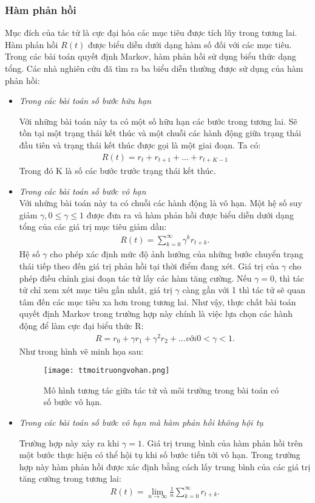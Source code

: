 \subsubsection{Hàm phản hồi}
Mục đích của tác tử là cực đại hóa các mục tiêu được tích lũy trong tương lai. Hàm phản hồi $R(t)$ được biểu diễn dưới dạng hàm số đối với các mục tiêu. Trong các bài toán quyết định Markov, hàm phản hồi sử dụng biểu thức dạng tổng. Các nhà nghiên cứu đã tìm ra ba biểu diễn thường được sử dụng của hàm phản hồi:
\begin{itemize}
\item \textit{Trong các bài toán số bước hữu hạn}

Với những bài toán này ta có một số hữu hạn các bước trong tương lai. Sẽ tồn tại một trạng thái kết thúc và một chuỗi các hành động giữa trạng thái đầu tiên và trạng thái kết thúc được gọi là một giai đoạn.
Ta có:
\begin{align*}
R(t)=r_{t}+r_{t+1}+...+r_{t+K-1}
\end{align*}
	Trong đó K là số các bước trước trạng thái kết thúc.
\item \textit{Trong các bài toán số bước vô hạn}\\
	Với những bài toán này ta có chuỗi các hành động là vô hạn. Một hệ số suy giảm $\gamma,0\leq \gamma \leq 1$ được đưa ra và hàm phản hồi được biểu diễn dưới dạng tổng của các giá trị mục tiêu giảm dần:
\begin{align*}
R(t)= \sum_{k=0}^{\infty} \gamma ^{k} r_{t+k}.
\end{align*}
Hệ số $\gamma$ cho phép xác định mức độ ảnh hưởng của những bước chuyển trạng thái tiếp theo đến giá trị phản hồi tại thời điểm đang xét. Giá trị của $\gamma$ cho phép điều chỉnh giai đoạn tác tử lấy các hàm tăng cường. Nếu $\gamma =0$, thì tác tử chỉ xem xét mục tiêu gần nhất, giá trị $\gamma$ càng gần với 1 thì tác tử sẽ quan tâm đến các mục tiêu xa hơn trong tương lai.
Như vậy, thực chất bài toán quyết định Markov trong trường hợp này chính là việc lựa chọn các hành động để làm cực đại biểu thức R:
\begin{align*}
R=r_{0}+\gamma r_{1}+\gamma^{2}r_{2}+... \textit{với} 0<\gamma <1.
\end{align*}
	Như trong hình vẽ minh họa sau:\\
	
\begin{figure}[ht]
    \centering
    \texttt{[image: ttmoitruongvohan.png]}
    \caption{Mô hình tương tác giữa tác tử và môi trường trong bài toán có số bước vô hạn.}
    \label{fig:tactumoitruong}
\end{figure}
\newpage
\item \textit{Trong các bài toán số bước vô hạn mà hàm phản hồi không hội tụ}

Trường hợp này xảy ra khi $\gamma = 1$. Giá trị trung bình của hàm phản hồi trên một bước thực hiện có thể hội tụ khi số bước tiến tới vô hạn. Trong trường hợp này hàm phản hồi được xác định bằng cách lấy trung bình của các giá trị tăng cường trong tương lai:
\begin{align*}
R(t)=\lim_{n\rightarrow \infty} \frac{1}{n}\sum_{k=0}^{\infty}r_{t+k}.
\end{align*}
\end{itemize}


